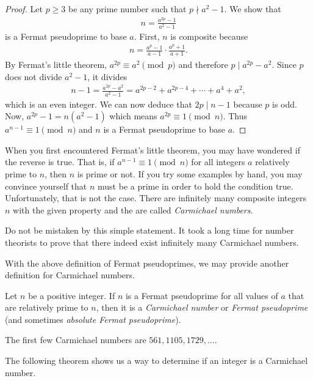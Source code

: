 \documentclass{subfile}
\begin{document}
		\begin{proof}
			Let $p\geq 3$ be any prime number such that $p \nmid a^2-1$. We show that
				\begin{align*}
					n = \frac{a^{2p}-1}{a^2-1}
				\end{align*}
			is a Fermat pseudoprime to base $a$. First, $n$ is composite because
				\begin{align*}
					n = \frac{a^p-1}{a-1}\cdot \frac{a^p+1}{a+1}.
				\end{align*}
			By Fermat's little theorem, $a^{2p} \equiv a^2 \pmod p$ and therefore $p\mid a^{2p}-a^2$. Since $p$ does not divide $a^2-1$, it divides
				\begin{align*}
					n-1 = \frac{a^{2p}-a^2}{a^2-1} = a^{2p-2}+a^{2p-4}+\cdots+a^4+a^2,
				\end{align*}
			which is an even integer. We can now deduce that $2p \mid n-1$ because $p$ is odd. Now, $a^{2p}-1 = n\left(a^2-1\right)$ which means $a^{2p} \equiv 1 \pmod n$. Thus $a^{n-1}\equiv 1 \pmod n$ and $n$ is a Fermat pseudoprime to base $a$.
		\end{proof}
	When you first encountered Fermat's little theorem, you may have wondered if the reverse is true. That is, if $a^{n-1}\equiv 1\pmod n$ for all integers $a$ relatively prime to $n$, then $n$ is prime or not. If you try some examples by hand, you may convince yourself that $n$ must be a prime in order to hold the condition true. Unfortunately, that is not the case. There are infinitely many composite integers $n$ with the given property and the are called \textit{Carmichael numbers}.
	\begin{note}
		Do not be mistaken by this simple statement. It took a long time for number theorists to prove that there indeed exist infinitely many Carmichael numbers.
	\end{note}
	With the above definition of Fermat pseudoprimes, we may provide another definition for Carmichael numbers.

		\begin{definition}
			Let $n$ be a positive integer. If $n$ is a Fermat pseudoprime for all values of $a$ that are relatively prime to $n$, then it is a \textit{Carmichael number} or \textit{Fermat pseudoprime} (and sometimes \textit{absolute Fermat pseudoprime}).
		\end{definition}

	The first few Carmichael numbers are $561, 1105, 1729, \dots$.

The following theorem shows us a way to determine if an integer is a Carmichael number.
\end{document}
